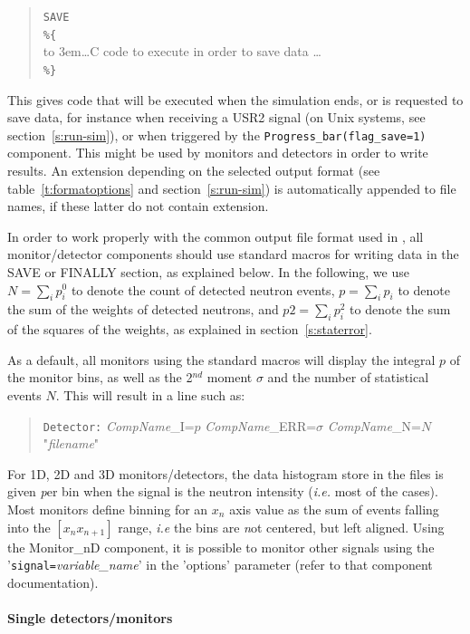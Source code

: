\begin{quote}
  \texttt{SAVE} \\
  \verb|%{| \\
  \hbox to 3em{}\ldots C code to execute in order to save data \ldots \\
  \verb|%}|
\end{quote}
This gives code that will be executed when the simulation ends, or is requested to save data, for instance when receiving a USR2 signal (on Unix systems, see section~\ref{s:run-sim}), or when triggered by the \texttt{Progress\_bar(flag\_save=1)} component.
This might be used by monitors and detectors in order to write results.
An extension depending on the selected output format (see table~\ref{t:formatoptions} and section~\ref{s:run-sim}) is automatically appended to file names, if these latter do not contain extension.

In order to work properly with the common output file format used in
\MCS, all monitor/detector components should use standard macros for
writing data in the SAVE or FINALLY section, as explained below. In the
following, we use $N = \sum_i p_i^0$ to denote the count of detected
neutron events, $p = \sum_i p_i$ to denote the sum of the weights of
detected neutrons, and $\textit{p2} = \sum_i p_i^2$ to denote the sum of
the squares of the weights, as explained in section~\ref{s:staterror}.

As a default, all monitors using the standard macros will display the
integral $p$ of the monitor bins, as well as the 2$^{nd}$ moment $\sigma$
and the number of statistical events $N$. This will result in a line such as:

\begin{quote}
\verb+Detector:+ {\it CompName}\_I=$p$ {\it CompName}\_ERR=$\sigma$ {\it CompName}\_N=$N$ "{\it filename}"
\end{quote}

For 1D, 2D and 3D monitors/detectors, the data histogram store in the files
is given {\emph per bin} when the signal is the neutron intensity ({\it i.e.} most of the cases). Most monitors define binning for an $x_n$ axis value as the sum of events falling into the $[ x_n x_{n+1} ]$ range, {\it i.e} the bins are {\emph not} centered, but left aligned.
Using the Monitor\_nD component, it is possible to monitor other signals using the
'\verb+signal=+{\it variable\_name}' in the 'options' parameter (refer to that
component documentation).

\paragraph{Single detectors/monitors}
\label{s:DETECTOR_OUT}

